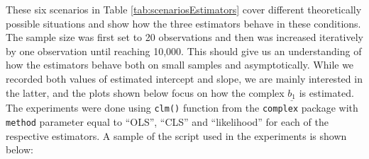 \documentclass[
]{book}
\begin{document}
These six scenarios in Table \ref{tab:scenariosEstimators} cover different theoretically possible situations and show how the three estimators behave in these conditions. The sample size was first set to 20 observations and then was increased iteratively by one observation until reaching 10,000. This should give us an understanding of how the estimators behave both on small samples and asymptotically. While we recorded both values of estimated intercept and slope, we are mainly interested in the latter, and the plots shown below focus on how the complex \(\underline{b_1}\) is estimated. The experiments were done using \texttt{clm()} function from the \texttt{complex} package with \texttt{method} parameter equal to ``OLS'', ``CLS'' and ``likelihood'' for each of the respective estimators. A sample of the script used in the experiments is shown below:
\end{document}
